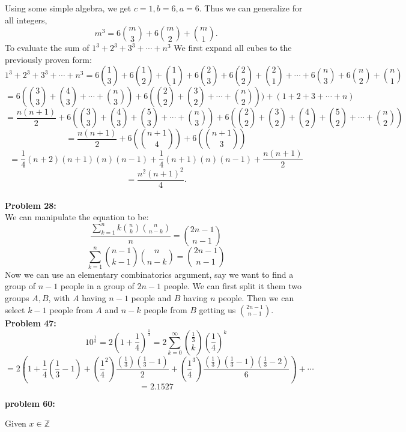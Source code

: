 \documentclass[12pt]{article}
\begin{document}
Using some simple algebra, we get $c = 1, b = 6, a = 6$. Thus we can generalize for all integers, 
\[
	m^3 = 6\binom{m}{3} + 6\binom{m}{2} + \binom{m}{1} 
.\] 
To evaluate the sum of $1^3 + 2^3 + 3^3 + \cdots + n^3$ We first expand all cubes to the previously
proven form: 
\[
	1^3 + 2^3 + 3^3 + \cdots + n^3 = 6\binom{1}{3} + 6\binom{1}{2} + \binom{1}{1} + 6\binom{2}{3} + 6\binom{2}{2} + \binom{2}{1} + \cdots + 6\binom{n}{3} + 6\binom{n}{2} + \binom{n}{1}
\]
\[
	= 6(\binom{3}{3} + \binom{4}{3} + \cdots + \binom{n}{3}) + 6(\binom{2}{2} + \binom{3}{2} + \cdots + \binom{n}{2})) + (1 + 2 + 3 + \cdots + n)		
\]
\[
	= \frac{n(n+1)}{2} + 6(\binom{3}{3} + \binom{4}{3} + \binom{5}{3} + \cdots + \binom{n}{3}) + 6(\binom{2}{2} + \binom{3}{2} + \binom{4}{2} + \binom{5}{2} + \cdots + \binom{n}{2})

\] 
\[
	= \frac{n(n+1)}{2} + 6(\binom{n+1}{4}) + 6(\binom{n+1}{3})
\]
\[
	= \frac{1}{4}(n+2)(n+1)(n)(n-1) + \frac{1}{4}(n+1)(n)(n-1) + \frac{n(n+1)}{2}
\] 
\[
	= \frac{n^{2}(n+1)^{2}}{4}
.\] \\

\noindent
\textbf{Problem 28: }\\

We can manipulate the equation to be:	
$$\frac{\sum^{n}_{k=1}k\binom{n}{k}\binom{n}{n-k}}{n} = \binom{2n-1}{n-1}$$
$$\sum^{n}_{k=1}\binom{n-1}{k-1}\binom{n}{n-k} = \binom{2n-1}{n-1}$$
Now we can use an elementary combinatorics argument, say we want to find a group of $n-1$ people in a group of $2n-1$ people.
We can first split it them two groups $A, B$, with $A$ having $n-1$ people and $B$ having $n$ people. Then we can 
select $k-1$ people from $A$ and $n-k$ people from $B$ getting us $\binom{2n-1}{n-1}$.\\

\noindent 
\textbf{Problem 47: } \\

$$10^{\frac{1}{3}} = 2(1 + \frac{1}{4})^{\frac{1}{3}} = 2\sum^{\infty}_{k=0} \binom{\frac{1}{3}}{k}(\frac{1}{4})^{k}$$
$$= 2(1 + \frac{1}{4}(\frac{1}{3}-1) + (\frac{1}{4}^{2}) \frac{(\frac{1}{3})(\frac{1}{3}-1)}{2} + (\frac{1}{4}^{3}) \frac{(\frac{1}{3})(\frac{1}{3}-1)(\frac{1}{3}-2)}{6}) + \cdots$$
$$= 2.1527$$

\noindent	
\textbf{problem 60: }

Given $x \in \mathbb{Z}$ 
\end{document}
